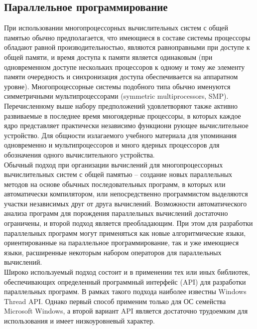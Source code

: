 \documentclass[a4paper, 12pt]{article}
\begin{document}
\begin{flushleft}
	\subsection{Параллельное программирование}
	\hspace*{5mm} При использовании многопроцессорных вычислительных систем с общей памятью обычно предполагается, что имеющиеся в составе системы процессоры обладают равной производительностью, являются равноправными при доступе к общей памяти, и время доступа к памяти является одинаковым (при одновременном доступе нескольких процессоров к одному и тому же элементу памяти очередность и синхронизация доступа обеспечивается на аппаратном уровне). Многопроцессорные системы подобного типа обычно именуются симметричными мультипроцессорами (symmetric multiprocessors, SMP).
	\\ \hspace*{5mm} Перечисленному выше набору предположений удовлетворяют также активно развиваемые в последнее время многоядерные процессоры, в которых каждое ядро представляет практически независимо функциони рующее вычислительное устройство. Для общности излагаемого учебного материала для упоминания одновременно и мультипроцессоров и много ядерных процессоров для обозначения одного вычислительного устройства.
	\\ \hspace*{5mm} Обычный подход при организации вычислений для многопроцессорных вычислительных систем с общей памятью – создание новых параллельных методов на основе обычных последовательных программ, в которых или автоматически компилятором, или непосредственно программистом выделяются участки независимых друг от друга вычислений. Возможности автоматического анализа программ для порождения параллельных вычислений достаточно ограничены, и второй подход является преобладающим. При этом для разработки параллельных программ могут применяться как новые алгоритмические языки, ориентированные на параллельное программирование, так и уже имеющиеся языки, расширенные некоторым набором операторов для параллельных вычислений.
	\\ \hspace*{5mm} Широко используемый подход состоит и в применении тех или иных библиотек, обеспечивающих определенный программный интерфейс (API) для разработки параллельных программ. В рамках такого подхода наиболее известны Windows Thread API. Однако первый способ применим только для ОС семейства Microsoft Windows, а второй вариант API является достаточно трудоемким для использования и имеет низкоуровневый характер. \cite{paral}

\end{flushleft}
\end{document}

